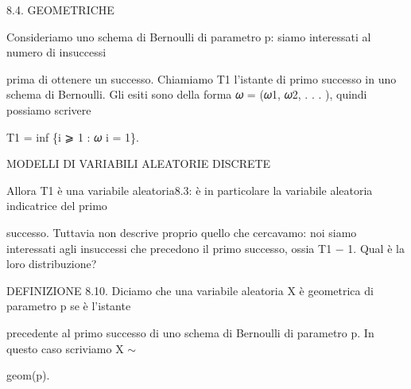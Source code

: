\documentclass[a4paper,portrait,12pt]{article}
\begin{document}
\begin{flushleft}
8.4. GEOMETRICHE
\end{flushleft}


\begin{flushleft}
Consideriamo uno schema di Bernoulli di parametro p: siamo interessati al numero di insuccessi
\end{flushleft}


\begin{flushleft}
prima di ottenere un successo. Chiamiamo T1 l'istante di primo successo in uno schema di Bernoulli. Gli esiti sono della forma 𝜔 = (𝜔1, 𝜔2, . . . ), quindi possiamo scrivere
\end{flushleft}


\begin{flushleft}
T1 = inf \{i ⩾ 1 : 𝜔 i = 1\}.
\end{flushleft}










\begin{flushleft}
MODELLI DI VARIABILI ALEATORIE DISCRETE
\end{flushleft}





\begin{flushleft}
Allora T1 \`{e} una variabile aleatoria8.3: \`{e} in particolare la variabile aleatoria indicatrice del primo
\end{flushleft}


\begin{flushleft}
successo. Tuttavia non descrive proprio quello che cercavamo: noi siamo interessati agli insuccessi che precedono il primo successo, ossia T1 $-$ 1. Qual \`{e} la loro distribuzione?
\end{flushleft}


\begin{flushleft}
DEFINIZIONE 8.10. Diciamo che una variabile aleatoria X \`{e} geometrica di parametro p se \`{e} l'istante
\end{flushleft}


\begin{flushleft}
precedente al primo successo di uno schema di Bernoulli di parametro p. In questo caso scriviamo X $\sim$
\end{flushleft}


\begin{flushleft}
geom(p).
\end{flushleft}
\end{document}
